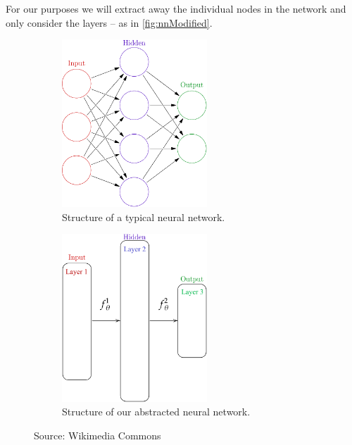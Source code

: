\documentclass[dissertation.tex]{subfiles}
\begin{document}
For our purposes we will extract away the individual nodes in the network and
only consider the layers -- as in \autoref{fig:nnModified}.
\begin{figure}[H]
  \centering
  \begin{subfigure}[t]{0.49\textwidth}
    \centering
    \includegraphics[width=0.6\textwidth]{figs/neural_network.png}
    \caption{
      Structure of a typical neural network.
    }
    \label{fig:nnOriginal}
  \end{subfigure}
  \hfill
  \begin{subfigure}[t]{0.49\textwidth}
    \centering
    \includegraphics[width=0.6\textwidth]{figs/neural_network_abstraction.png}
    \caption{
      Structure of our abstracted neural network.
    }
    \label{fig:nnModified}
  \end{subfigure}
    \caption{
      Source: Wikimedia Commons 
    }
\end{figure}
\end{document}
